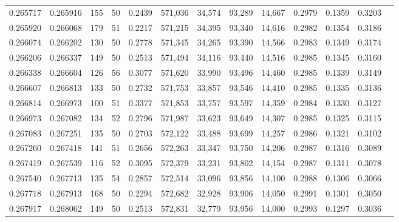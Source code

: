 \begin{tabular}{rrrrrrrrrrrrr}
0.265717 & 0.265916 &   155 &  50 &                                     0.2439 & 571,036 &  34,574 &  93,289 &  14,667 & 0.2979 & 0.1359 & 0.3203 \\
0.265920 & 0.266068 &   179 &  51 &                                     0.2217 & 571,215 &  34,395 &  93,340 &  14,616 & 0.2982 & 0.1354 & 0.3186 \\
0.266074 & 0.266202 &   130 &  50 &                                     0.2778 & 571,345 &  34,265 &  93,390 &  14,566 & 0.2983 & 0.1349 & 0.3174 \\
0.266206 & 0.266337 &   149 &  50 &                                     0.2513 & 571,494 &  34,116 &  93,440 &  14,516 & 0.2985 & 0.1345 & 0.3160 \\
0.266338 & 0.266604 &   126 &  56 &                                     0.3077 & 571,620 &  33,990 &  93,496 &  14,460 & 0.2985 & 0.1339 & 0.3149 \\
0.266607 & 0.266813 &   133 &  50 &                                     0.2732 & 571,753 &  33,857 &  93,546 &  14,410 & 0.2985 & 0.1335 & 0.3136 \\
0.266814 & 0.266973 &   100 &  51 &                                     0.3377 & 571,853 &  33,757 &  93,597 &  14,359 & 0.2984 & 0.1330 & 0.3127 \\
0.266973 & 0.267082 &   134 &  52 &                                     0.2796 & 571,987 &  33,623 &  93,649 &  14,307 & 0.2985 & 0.1325 & 0.3115 \\
0.267083 & 0.267251 &   135 &  50 &                                     0.2703 & 572,122 &  33,488 &  93,699 &  14,257 & 0.2986 & 0.1321 & 0.3102 \\
0.267260 & 0.267418 &   141 &  51 &                                     0.2656 & 572,263 &  33,347 &  93,750 &  14,206 & 0.2987 & 0.1316 & 0.3089 \\
0.267419 & 0.267539 &   116 &  52 &                                     0.3095 & 572,379 &  33,231 &  93,802 &  14,154 & 0.2987 & 0.1311 & 0.3078 \\
0.267540 & 0.267713 &   135 &  54 &                                     0.2857 & 572,514 &  33,096 &  93,856 &  14,100 & 0.2988 & 0.1306 & 0.3066 \\
0.267718 & 0.267913 &   168 &  50 &                                     0.2294 & 572,682 &  32,928 &  93,906 &  14,050 & 0.2991 & 0.1301 & 0.3050 \\
0.267917 & 0.268062 &   149 &  50 &                                     0.2513 & 572,831 &  32,779 &  93,956 &  14,000 & 0.2993 & 0.1297 & 0.3036 \\

\end{tabular}
